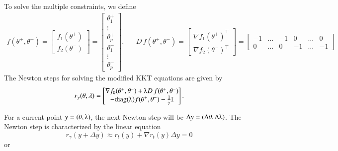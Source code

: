 \documentclass[11pt]{article}
\begin{document}
To solve the multiple constraints, we define 
\begin{align*}
f(\theta^+, \theta^-) = \begin{bmatrix}f_1(\theta^+)\\f_2(\theta^-)\end{bmatrix} = \begin{bmatrix}\theta_1^+\\\vdots\\\theta_p^+\\\theta_1^-\\\vdots\\\theta_p^-\end{bmatrix},&& 
D\,f(\theta^+, \theta^-) =\begin{bmatrix}\nabla f_1(\theta^+)^\top\\\nabla f_2(\theta^-)^\top\end{bmatrix} = \begin{bmatrix}-1&\hdots&-1&0&\hdots&0\\0&\hdots&0&-1&\hdots&-1\end{bmatrix}
\end{align*}
The Newton steps for solving the modified KKT equations are given by 
\[r_\gamma(\theta, \lambda) = \begin{bmatrix}
\nabla f_0(\theta^+,\theta^-) + \lambdaup D\,f(\theta^+, \theta^-)\\
-\text{diag}(\lambdaup)f(\theta^+, \theta^-) - \frac{1}{\gamma}\mathbb{I}
\end{bmatrix}.\]

For a current point $y = \left(\theta, \lambdaup\right)$, the next Newton step will be $\Delta y = \left(\Delta\theta, \Delta\lambdaup\right)$. The Newton step is characterized by the linear equation
\[r_\gamma(y + \Delta y) \approx r_t(y) + \nabla r_t(y)\Delta y = 0\] or 
\end{document}

